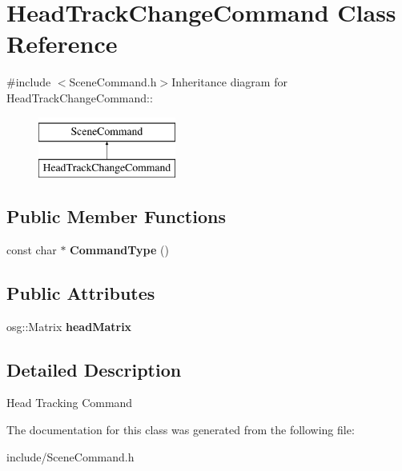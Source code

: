 \hypertarget{class_head_track_change_command}{
\section{HeadTrackChangeCommand Class Reference}
\label{class_head_track_change_command}
}


{\ttfamily \#include $<$SceneCommand.h$>$}Inheritance diagram for HeadTrackChangeCommand::\begin{figure}[H]
\begin{center}
\leavevmode
\includegraphics[height=2cm]{class_head_track_change_command}
\end{center}
\end{figure}
\subsection*{Public Member Functions}
\begin{DoxyCompactItemize}
\item 
\hypertarget{class_head_track_change_command_a213c9135c2b79aeb55cf96aac7427d3b}{
const char $\ast$ {\bfseries CommandType} ()}
\label{class_head_track_change_command_a213c9135c2b79aeb55cf96aac7427d3b}

\end{DoxyCompactItemize}
\subsection*{Public Attributes}
\begin{DoxyCompactItemize}
\item 
\hypertarget{class_head_track_change_command_a019693d23ae89cec32d897e392cb83c9}{
osg::Matrix {\bfseries headMatrix}}
\label{class_head_track_change_command_a019693d23ae89cec32d897e392cb83c9}

\end{DoxyCompactItemize}


\subsection{Detailed Description}
Head Tracking Command 

The documentation for this class was generated from the following file:\begin{DoxyCompactItemize}
\item 
include/SceneCommand.h\end{DoxyCompactItemize}
